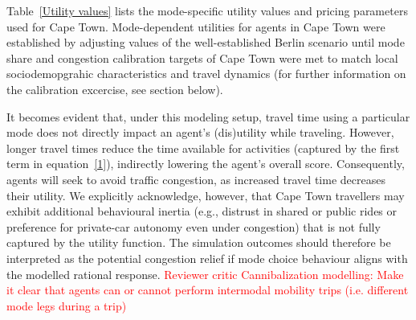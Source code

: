 \documentclass[main.tex]{subfiles}
\begin{document}
Table~\ref{Utility values} lists the mode-specific utility values and pricing parameters used for Cape Town. Mode-dependent utilities for agents in Cape Town were established by adjusting values of the well-established Berlin scenario \citep{Ziemke.2019} until mode share and congestion calibration targets of Cape Town were met to match local sociodemopgrahic characteristics and travel dynamics (for further information on the calibration excercise, see section below).

\begin{table}[H]
\centering
{}
\caption{Varying utility and pricing parameters for different transportation modes available in the simulation}
\label{Utility values}
\end{table}

It becomes evident that, under this modeling setup, travel time using a particular mode does not directly impact an agent's (dis)utility while traveling. However, longer travel times reduce the time available for activities (captured by the first term in equation~\ref{1}), indirectly lowering the agent’s overall score. Consequently, agents will seek to avoid traffic congestion, as increased travel time decreases their utility. We explicitly acknowledge, however, that Cape Town travellers may exhibit additional behavioural inertia (e.g., distrust in shared or public rides or preference for private-car autonomy even under congestion) that is not fully captured by the utility function. The simulation outcomes should therefore be interpreted as the potential congestion relief if mode choice behaviour aligns with the modelled rational response. \textcolor{red}{Reviewer critic Cannibalization modelling: Make it clear that agents can or cannot perform intermodal mobility trips (i.e. different mode legs during a trip) }
\end{document}
